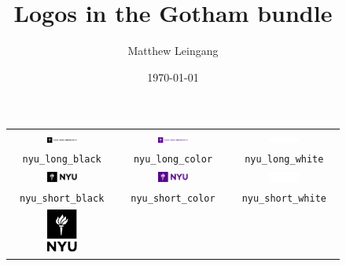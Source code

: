 \documentclass{article}
\title{Logos in the Gotham bundle}
\author{Matthew Leingang}
\date{\today}
\begin{document}
\maketitle

\begin{figure}
    \centering
    \begin{tabular}{ccc}
        \includegraphics[width=0.3\textwidth]{nyu_long_black} &
        \includegraphics[width=0.3\textwidth]{nyu_long_color} &
        \includegraphics[width=0.3\textwidth]{nyu_long_white} \\
        \texttt{nyu\_long\_black} &
        \texttt{nyu\_long\_color} &
        \texttt{nyu\_long\_white} \\[2em]
        \includegraphics[width=0.3\textwidth]{nyu_short_black} &
        \includegraphics[width=0.3\textwidth]{nyu_short_color} &
        \includegraphics[width=0.3\textwidth]{nyu_short_white} \\
        \texttt{nyu\_short\_black} &
        \texttt{nyu\_short\_color} &
        \texttt{nyu\_short\_white} \\[2em]
        \includegraphics[width=0.3\textwidth]{nyu_stacked_black} &

\end{tabular}
\end{figure}
\end{document}
